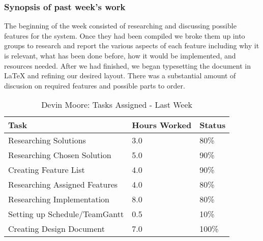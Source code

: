 \documentclass[12pt,article,compsoc]{IEEEtran}
\begin{document}
	\subsubsection*{Synopsis of past week's work}

	The beginning of the week consisted of researching and discussing possible features for the system. 
	Once they had been compiled we broke them up into groups to research and report the various
	aspects of each feature including why it is relevant, what has been done before, how it would be
	implemented, and resources needed. After we had finished, we began typesetting the document in \LaTeX
	and refining our desired layout. There was a substantial amount of discusion on required features and 
    possible parts to order.


	\begin{table}[ht]
	\renewcommand{\arraystretch}{1.3}
		\caption{Devin Moore: Tasks Assigned - Last Week}
		
		\label{Summary of Devin Moore's activities: last week}
		
		\centering
		\begin{tabular}{p{5.5cm}|p{1cm}|p{1cm}}

		\hline
		\bfseries 	Task		 		                    & \bfseries Hours Worked	& \bfseries Status	\\
		\hline\hline
					Researching Solutions					& 3.0						& 80\%				\\
					Researching Chosen Solution				& 5.0						& 90\%				\\
					Creating Feature List					& 4.0						& 90\%				\\
                    Researching Assigned Features           & 4.0                       & 80\%              \\
					Researching Implementation				& 8.0						& 80\%				\\
					Setting up Schedule/TeamGantt			& 0.5						& 10\%				\\
					Creating Design Document				& 7.0						& 100\%				\\
		\hline
		\end{tabular}
	\end{table}
\end{document}
